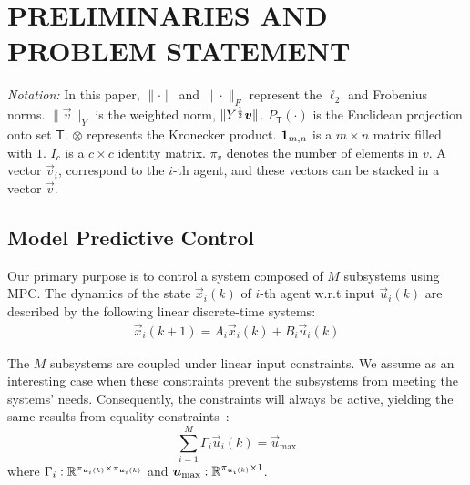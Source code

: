 \documentclass[a4paper, 10 pt, conference]{ieeeconf}  %
\begin{document}
\section{PRELIMINARIES AND PROBLEM STATEMENT}\label{sec:PS}
\emph{Notation:} In this paper, $\|\cdot\|$ and $\|\cdot\|_{F}$ represent the $\ell_{2}$ and Frobenius norms. $\|\vec{v}\|_{Y}$ is the weighted norm, $\|Y^{1\over 2}\vec{v}\|$.
$P_{\mathsf{T}}(\cdot)$ is the Euclidean projection onto set $\mathsf{T}$.
$\otimes$ represents the Kronecker product. $\1_{m,n}$ is a ${m\times n}$ matrix filled with $1$.
$I_{c}$ is a ${c\times c}$ identity matrix.
$\pi_{v}$ denotes the number of elements in $v$.
A vector $\vec{v}_{i}$, correspond to the $i$-th agent, and these vectors can be stacked in a vector $\vec{v}$.

\subsection{Model Predictive Control}\label{ssec:MPC}
Our primary purpose is to control a system composed of $M$ subsystems using MPC\@.
The dynamics of the state ${\vec{x}_{i}(k)}$ of $i$-th agent w.r.t
input ${\vec{u}_{i}(k)}$ are described by the following linear discrete-time systems:
\begin{equation}
\begin{matrix}
  \label{eq:systems}
\vec{x}_{i}(k+1)=A_{i}\vec{x}_{i}(k) + B_{i}\vec{u}_{i}(k)
\end{matrix}
\end{equation}


The $M$ subsystems are coupled under linear input constraints.
We assume as an interesting case when these constraints prevent the subsystems from meeting the systems' needs. Consequently, the constraints will always be active, yielding the same results from equality constraints~\cite{BoydVandenberghe2004}:
\begin{equation}
  \label{eq:constraint}
  \sum^{M}_{i=1}\Gamma_{i}\vec{u}_{i}(k)=\vec{u}_{\mathrm{\max}}
\end{equation}
where $\Gamma_{i}:\R^{\pi_{\vec{u}_{i}(k)}\times \pi_{\vec{u}_{i}(k)}}$ and $\vec{u}_{\mathrm{max}}:\R^{\pi_{\vec{u}_{i}(k)}\times 1}$.
\end{document}
